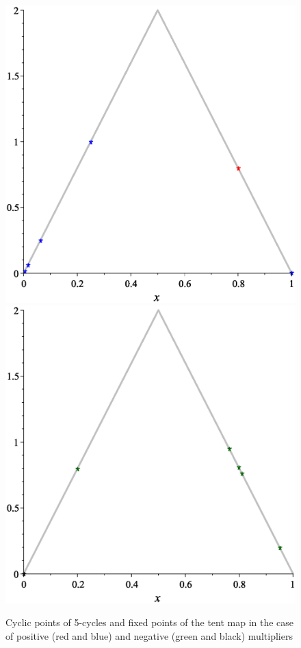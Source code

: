 \documentclass[12pt,a4paper]{amsart}
\begin{document}
\begin{figure}[h!]
\centering
\includegraphics[scale=0.28]{Fig14a}
\hspace{1cm}
\includegraphics[scale=0.28]{Fig14b}
\caption{Cyclic points of 5-cycles and fixed points of the tent map in the case of positive (red and blue) and negative (green and black) multipliers} \label{f14}
\end{figure}
\end{document}
